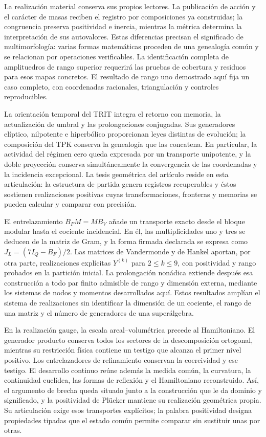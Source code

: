 \documentclass[a4paper,10pt]{article}
\theoremstyle{definition}\newtheorem{definition}[theorem]{Definición}
\theoremstyle{remark}\newtheorem{remark}[theorem]{Observación}
\numberwithin{equation}{section}
\begin{document}
La realización material conserva sus propios lectores. La publicación de
acción y el carácter de masas reciben el registro por composiciones ya
construidas; la congruencia preserva positividad e inercia, mientras la
métrica determina la interpretación de sus autovalores. Estas diferencias
precisan el significado de multimorfología: varias formas matemáticas
proceden de una genealogía común y se relacionan por operaciones verificables.
La identificación completa de amplituedros de rango superior requerirá
las pruebas de cobertura y residuos para esos mapas concretos. El resultado
de rango uno demostrado aquí fija un caso completo, con coordenadas
racionales, triangulación y controles reproducibles.

La orientación temporal del TRIT integra el retorno con memoria, la
actualización de umbral y las prolongaciones conjugadas. Sus generadores
elíptico, nilpotente e hiperbólico proporcionan leyes distintas de
evolución; la composición del TPK conserva la genealogía que las
concatena. En particular, la actividad del régimen cero queda expresada
por un transporte unipotente, y la doble proyección conserva simultáneamente
la convergencia de las coordenadas y la incidencia excepcional. La tesis
geométrica del artículo reside en esta articulación: la estructura de
partida genera registros recuperables y éstos sostienen realizaciones
positivas cuyas transformaciones, fronteras y memorias se pueden calcular
y comparar con precisión.

El entrelazamiento \(B_FM=MB_V\) añade un transporte exacto desde el
bloque modular hasta el cociente incidencial. En él, las multiplicidades
uno y tres se deducen de la matriz de Gram, y la forma firmada declarada
se expresa como \(J_L=(7I_Q-\overline B_F)/2\). Las matrices de
Vandermonde y de Hankel aportan, por otra parte, realizaciones explícitas
\(Y^{(k)}\) para \(2\le k\le9\), con positividad y rango probados
en la partición inicial. La prolongación nonádica extiende después
esa construcción a todo par finito admisible de rango y dimensión
externa, mediante los sistemas de nodos y momentos desarrollados aquí.
Estos resultados amplían el sistema de realizaciones sin identificar
la dimensión de un cociente, el rango de una matriz y el número de
generadores de una superálgebra.

En la realización gauge, la escala areal--volumétrica precede al
Hamiltoniano. El generador producto conserva todos los sectores de la
descomposición ortogonal, mientras su restricción física contiene un
testigo que alcanza el primer nivel positivo. Los entrelazadores de
refinamiento conservan la coercividad y ese testigo. El desarrollo
continuo reúne además la medida común, la curvatura, la continuidad
euclídea, las formas de reflexión y el Hamiltoniano reconstruido. Así,
el argumento de brecha queda situado junto a la construcción que le da
dominio y significado, y la positividad de Plücker mantiene su realización
geométrica propia. Su articulación exige esos transportes explícitos;
la palabra positividad designa propiedades tipadas que el estado común
permite comparar sin sustituir unas por otras.
\end{document}
